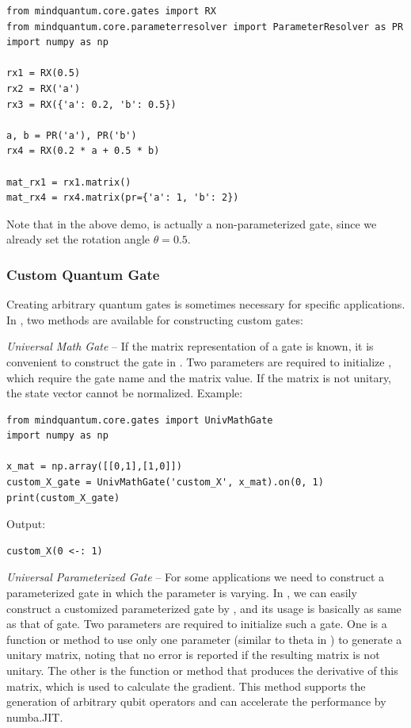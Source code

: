 \begin{lstlisting}
from mindquantum.core.gates import RX
from mindquantum.core.parameterresolver import ParameterResolver as PR
import numpy as np

rx1 = RX(0.5)
rx2 = RX('a')
rx3 = RX({'a': 0.2, 'b': 0.5})

a, b = PR('a'), PR('b')
rx4 = RX(0.2 * a + 0.5 * b)

mat_rx1 = rx1.matrix()
mat_rx4 = rx4.matrix(pr={'a': 1, 'b': 2})
\end{lstlisting}

Note that in the above demo,  is actually a non-parameterized gate, since we already set the rotation angle $\theta = 0.5$.

\subsubsection{Custom Quantum Gate}
Creating arbitrary quantum gates is sometimes necessary for specific applications. In \MindQuantum, two methods are available for constructing custom gates:

\textit{Universal Math Gate} -- If the matrix representation of a gate is known, it is convenient to construct the gate in \MindQuantum. Two parameters are required to initialize \UnivMathGate, which require the gate name and the matrix value. If the matrix is not unitary, the state vector cannot be normalized.
Example:
\begin{lstlisting}
from mindquantum.core.gates import UnivMathGate
import numpy as np

x_mat = np.array([[0,1],[1,0]])
custom_X_gate = UnivMathGate('custom_X', x_mat).on(0, 1)
print(custom_X_gate)
\end{lstlisting}

Output:
\begin{lstlisting}
custom_X(0 <-: 1)
\end{lstlisting}

\textit{Universal Parameterized Gate} -- For some applications we need to construct a parameterized gate in which the parameter is varying. In \MindQuantum, we can easily construct a customized parameterized gate by \geneunivparameterizedgate, and its usage is basically as same as that of \RX gate. Two parameters are required to initialize such a gate. One is a function or method to use only one parameter (similar to theta in \RX) to generate a unitary matrix, noting that no error is reported if the resulting matrix is not unitary. The other is the function or method that produces the derivative of this matrix, which is used to calculate the gradient. This method supports the generation of arbitrary qubit operators and can accelerate the performance by numba.JIT.

